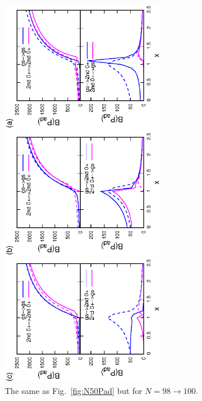 \documentclass[11pt]{book} %
\begin{document}
\begin{figure}[t]
 \begin{minipage}{0.3\hsize}
 \begin{center}
  \includegraphics[width=70mm,angle=-90]{images/N100Pad_CQ.eps}
 \end{center}
 \captionsetup{labelformat=empty,labelsep=none}
 \end{minipage}
 \begin{minipage}{0.3\hsize}
 \begin{center}
  \includegraphics[width=70mm,angle=-90]{images/N100Pad_FD.eps}
 \end{center}
 \captionsetup{labelformat=empty,labelsep=none}
 \end{minipage}
 \begin{minipage}{0.3\hsize}
 \begin{center}
  \includegraphics[width=70mm,angle=-90]{images/N100Pad_SPA.eps}
 \end{center}
 \captionsetup{labelformat=empty,labelsep=none}
 \end{minipage}
 \caption{
The same as Fig.~\ref{fig:N50Pad} but for $N=98\rightarrow 100$.}
 \label{fig:N100Pad}
\end{figure}
\end{document}

